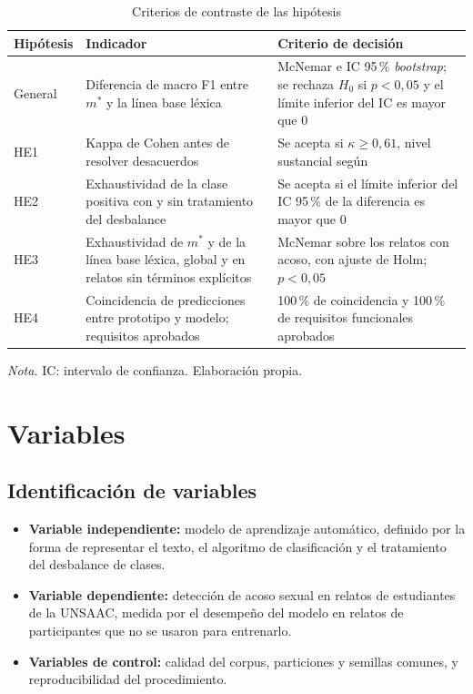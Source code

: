 \begin{table}[H]
\begin{threeparttable}
\caption{Criterios de contraste de las hipótesis}
\label{tab:contraste}
\singlespacing\small
\renewcommand{\arraystretch}{1.35}
\begin{tabular}{@{}L{2cm} L{5.6cm} L{7.8cm}@{}}
\toprule
\textbf{Hipótesis} & \textbf{Indicador} & \textbf{Criterio de decisión} \\
\midrule
General & Diferencia de macro F1 entre $m^{*}$ y la línea base léxica & McNemar e IC 95\,\% \textit{bootstrap}; se rechaza $H_0$ si $p < 0{,}05$ y el límite inferior del IC es mayor que 0 \\
HE1 & Kappa de Cohen antes de resolver desacuerdos & Se acepta si $\kappa \geq 0{,}61$, nivel sustancial según \citet{landis1977} \\
HE2 & Exhaustividad de la clase positiva con y sin tratamiento del desbalance & Se acepta si el límite inferior del IC 95\,\% de la diferencia es mayor que 0 \\
HE3 & Exhaustividad de $m^{*}$ y de la línea base léxica, global y en relatos sin términos explícitos & McNemar sobre los relatos con acoso, con ajuste de Holm; $p < 0{,}05$ \\
HE4 & Coincidencia de predicciones entre prototipo y modelo; requisitos aprobados & 100\,\% de coincidencia y 100\,\% de requisitos funcionales aprobados \\
\bottomrule
\end{tabular}
\begin{tablenotes}[flushleft]
\small
\item \textit{Nota.} IC: intervalo de confianza. Elaboración propia.
\end{tablenotes}
\end{threeparttable}
\end{table}

\section{Variables}

\subsection{Identificación de variables}
\begin{itemize}
	\item \textbf{Variable independiente:} modelo de aprendizaje automático, definido por la forma de representar el texto, el algoritmo de clasificación y el tratamiento del desbalance de clases.
	\item \textbf{Variable dependiente:} detección de acoso sexual en relatos de estudiantes de la UNSAAC, medida por el desempeño del modelo en relatos de participantes que no se usaron para entrenarlo.
	\item \textbf{Variables de control:} calidad del corpus, particiones y semillas comunes, y reproducibilidad del procedimiento.
\end{itemize}

